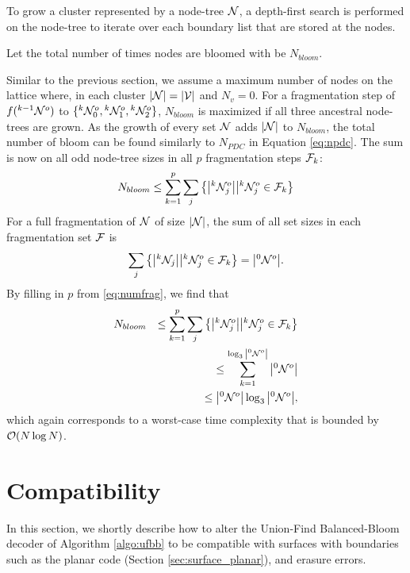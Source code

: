 To grow a cluster represented by a node-tree $\mathcal{N}$, a depth-first search is performed on the node-tree to iterate over each boundary list that are stored at the nodes. 
\begin{definition}\label{def:nbloom}
  Let the total number of times nodes are bloomed with  be $N_{bloom}$.
\end{definition}

Similar to the previous section, we assume a maximum number of nodes on the lattice where, in each cluster $|\mathcal{N}| = |\mathcal{V}|$ and $N_v = 0$. For a fragmentation step of $f({}^{k-1}\mathcal{N}^o)$ to $\{{}^{k}\mathcal{N}^o_0, {}^{k}\mathcal{N}^o_1, {}^{k}\mathcal{N}^o_2\}$, $N_{bloom}$ is maximized if all three ancestral node-trees are grown. As the growth of every set $\mathcal{N}$ adds $|\mathcal{N}|$ to $N_{bloom}$, the total number of bloom can be found similarly to $N_{PDC}$ in Equation \eqref{eq:npdc}. The sum is now on all odd node-tree sizes in all $p$ fragmentation steps $\mathcal{F}_k$: 
\begin{equation}\label{eq:nnode}
  N_{bloom} \leq \sum^{p}_{k=1}\sum_j \left\{ \abs{{}^{k}\mathcal{N}^o_j} \big| {}^{k}\mathcal{N}^o_j \in \mathcal{F}_k \right\}
\end{equation}
For a full fragmentation of $\mathcal{N}$ of size $|\mathcal{N}|$, the sum of all set sizes in each fragmentation set $\mathcal{F}$ is
\begin{equation}\label{eq:sumsetsfrag}
  \sum_j \left\{ \abs{{}^{k}\mathcal{N}_j} \big| {}^{k}\mathcal{N}^o_j \in \mathcal{F}_k \right\} = \abs{{}^{0}\mathcal{N}^o}.
\end{equation}
By filling in $p$ from \eqref{eq:numfrag}, we find that
\begin{align}
  \nonumber & N_{bloom} &\leq \sum^{p}_{k=1}\sum_j \left\{ \abs{{}^{k}\mathcal{N}^o_j} \big| {}^{k}\mathcal{N}^o_j \in \mathcal{F}_k \right\} &\\
  \nonumber             &&\leq \sum_{k=1}^{\log_3{\abs{{}^{0}\mathcal{N}^o}}} \abs{{}^{0}\mathcal{N}^o} &\\
                        &&\leq \abs{{}^{0}\mathcal{N}^o}\log_3{\abs{{}^{0}\mathcal{N}^o}}, &
\end{align}
which again corresponds to a worst-case time complexity that is bounded by $\mathcal{O}(N\log{N})$.

\section{Compatibility}\label{sec:ufbbcompatibility}

In this section, we shortly describe how to alter the Union-Find Balanced-Bloom decoder of Algorithm \ref{algo:ufbb} to be compatible with surfaces with boundaries such as the planar code (Section \ref{sec:surface_planar}), and erasure errors. 

